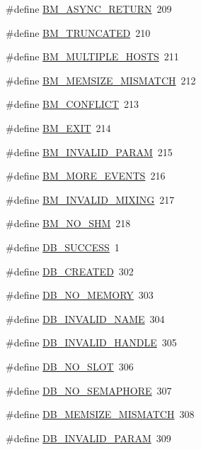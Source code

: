 \begin{DoxyCompactItemize}
\#define \hyperlink{group__err22_ga7fb11aaff606b1785cddd205baddbbff}{BM\_\-ASYNC\_\-RETURN}~209
\item 
\#define \hyperlink{group__err22_ga21752d578978d7ffe3cdd82e28936667}{BM\_\-TRUNCATED}~210
\item 
\#define \hyperlink{group__err22_gad1a172c4643fd4a0227f0df5bcfbd0b4}{BM\_\-MULTIPLE\_\-HOSTS}~211
\item 
\#define \hyperlink{group__err22_ga2d978469667eb3d51ea7cc48a5070a72}{BM\_\-MEMSIZE\_\-MISMATCH}~212
\item 
\#define \hyperlink{group__err22_ga0703bfd174e660aba961c696766e7066}{BM\_\-CONFLICT}~213
\item 
\#define \hyperlink{group__err22_gaa73f629c281190fdd092eed493b5245a}{BM\_\-EXIT}~214
\item 
\#define \hyperlink{group__err22_ga09095b8ac6e057d3094c99e485c1a74d}{BM\_\-INVALID\_\-PARAM}~215
\item 
\#define \hyperlink{group__err22_ga0ef7db8ae9812d639f07e3d654d76e90}{BM\_\-MORE\_\-EVENTS}~216
\item 
\#define \hyperlink{group__err22_ga57d1cf336a7a69397d8a6b1d2d40bf27}{BM\_\-INVALID\_\-MIXING}~217
\item 
\#define \hyperlink{group__err22_gaf32276ec7c00c33b4c45bd0b382b8ffb}{BM\_\-NO\_\-SHM}~218
\item 
\#define \hyperlink{group__err23_ga4d6ab4d32144d851ddeb7931b81a63e3}{DB\_\-SUCCESS}~1
\item 
\#define \hyperlink{group__err23_gabd18ddb49dba3429ea159610875283ec}{DB\_\-CREATED}~302
\item 
\#define \hyperlink{group__err23_ga53ba0057ac441528c24b8485c80dbbe3}{DB\_\-NO\_\-MEMORY}~303
\item 
\#define \hyperlink{group__err23_ga871ab09b39556a4328e80497ed13088b}{DB\_\-INVALID\_\-NAME}~304
\item 
\#define \hyperlink{group__err23_ga2b43bd45a32dd2121296f02c267ccc6d}{DB\_\-INVALID\_\-HANDLE}~305
\item 
\#define \hyperlink{group__err23_gafbb1117afac5c259b09143378b454dcb}{DB\_\-NO\_\-SLOT}~306
\item 
\#define \hyperlink{group__err23_ga1e4b50982e450b4c6a86a20e9120efbd}{DB\_\-NO\_\-SEMAPHORE}~307
\item 
\#define \hyperlink{group__err23_ga30ce4ec4017c1d210d2b72497aad6835}{DB\_\-MEMSIZE\_\-MISMATCH}~308
\item 
\#define \hyperlink{group__err23_ga3190934848311dc41f20d5e4ce285339}{DB\_\-INVALID\_\-PARAM}~309

\end{DoxyCompactItemize}
